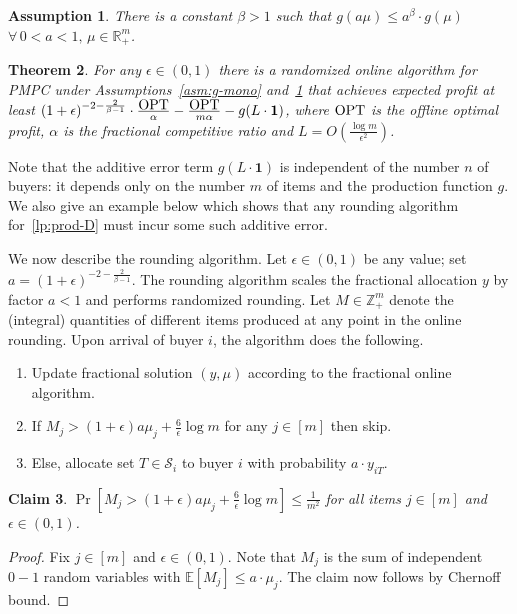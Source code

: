 \documentclass[letterpaper,11pt]{article}
\newtheorem{thm}{Theorem}[section]
\newtheorem{assumption}[thm]{Assumption}
\newtheorem{claim}[thm]{Claim}
\def \RR   {{\mathbb R}}
\def \OPT  {\mbox{\rm OPT}}
\def\E{\mathbb{E}}
\def\cS{\mathcal{S}}
\begin{document}
\begin{assumption}   \label{asm:g-rnd}
There is a constant $\beta>1$ such that $g(a \mu)\le a^{\beta}\cdot g(\mu)$ $\forall\, 0<a<1,\, \mu\in \RR^m_+$.
\end{assumption}

\begin{thm}\label{thm:prod-integral}
For any $\epsilon\in (0,1)$ there is a randomized online algorithm for PMPC under Assumptions~\ref{asm:g-mono} and~\ref{asm:g-rnd}   that achieves expected profit at least $(1+\epsilon)^{-2-\frac{2}{\beta-1}}\cdot \frac{\OPT}{\alpha} - \frac{\OPT}{m\alpha} - g(L\cdot \mathbf{1})$, where $\OPT$ is the offline optimal profit, $\alpha$ is the fractional competitive ratio and $L=O(\frac{\log m}{\epsilon^2})$.
\end{thm}

Note that the additive error term $g(L\cdot \mathbf{1})$ is independent of the number $n$ of buyers: it depends only on the number $m$ of  items and the production function $g$. We also give an example below which shows that any rounding algorithm for~\eqref{lp:prod-D} must incur some such additive error.


We now describe the rounding algorithm. Let $\epsilon\in(0,1)$ be any value; set $a=(1+\epsilon)^{-2-\frac{2}{\beta-1}}$. The rounding algorithm scales the fractional allocation $y$ by factor $a<1$ and performs randomized rounding. Let $M\in \mathbb{Z}_+^m$ denote the (integral) quantities of different items produced at any point in the online rounding.  Upon arrival of buyer $i$, the algorithm does the following.
\begin{enumerate}
\item Update fractional solution $(y,\mu)$ according to the fractional online algorithm.
\item If $M_j > (1+\epsilon) a\mu_j + \frac6\epsilon \log m$ for any $j\in[m]$ then skip.
\item Else, allocate set $T \in \cS_i$ to buyer $i$ with probability $a\cdot y_{iT}$.
\end{enumerate}

\begin{claim}\label{clm:prod-rnd}
$\Pr[M_j>(1+\epsilon) a\mu_j + \frac6\epsilon \log m] \le \frac{1}{m^2}$ for all items $j\in[m]$ and $\epsilon\in (0,1)$.
\end{claim}
\begin{proof}
Fix $j\in[m]$ and $\epsilon\in (0,1)$. Note that $M_j$ is the sum of independent $0-1$ random variables with $\E[M_j]\le a\cdot \mu_j$. The claim now follows by Chernoff bound.
\end{proof}
\end{document}
